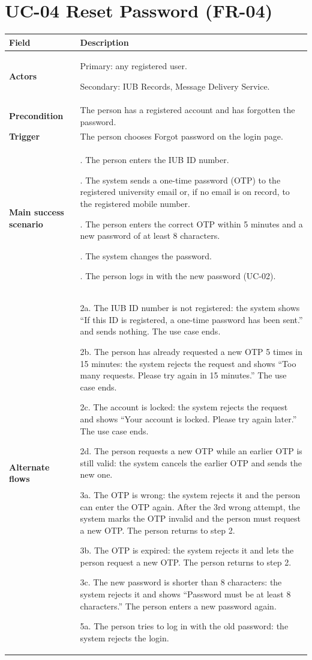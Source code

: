 \documentclass[11pt,a4paper]{report}
\begin{document}
\section{UC-04 Reset Password (FR-04)}
\begin{longtable}{|>{\raggedright\arraybackslash}p{3.0cm}|>{\raggedright\arraybackslash}p{12.4cm}|}
\hline \textbf{Field} & \textbf{Description} \\ \hline \endhead
\textbf{Actors} & Primary: any registered user.\par\smallskip Secondary: IUB Records, Message Delivery Service. \\ \hline
\textbf{Precondition} & The person has a registered account and has forgotten the password. \\ \hline
\textbf{Trigger} & The person chooses Forgot password on the login page. \\ \hline
\textbf{Main success scenario} & 1. The person enters the IUB ID number.\par\smallskip 2. The system sends a one-time password (OTP) to the registered university email or, if no email is on record, to the registered mobile number.\par\smallskip 3. The person enters the correct OTP within 5 minutes and a new password of at least 8 characters.\par\smallskip 4. The system changes the password.\par\smallskip 5. The person logs in with the new password (UC-02). \\ \hline
\textbf{Alternate flows} & 2a. The IUB ID number is not registered: the system shows ``If this ID is registered, a one-time password has been sent.'' and sends nothing. The use case ends.\par\smallskip 2b. The person has already requested a new OTP 5 times in 15 minutes: the system rejects the request and shows ``Too many requests. Please try again in 15 minutes.'' The use case ends.\par\smallskip 2c. The account is locked: the system rejects the request and shows ``Your account is locked. Please try again later.'' The use case ends.\par\smallskip 2d. The person requests a new OTP while an earlier OTP is still valid: the system cancels the earlier OTP and sends the new one.\par\smallskip 3a. The OTP is wrong: the system rejects it and the person can enter the OTP again. After the 3rd wrong attempt, the system marks the OTP invalid and the person must request a new OTP. The person returns to step 2.\par\smallskip 3b. The OTP is expired: the system rejects it and lets the person request a new OTP. The person returns to step 2.\par\smallskip 3c. The new password is shorter than 8 characters: the system rejects it and shows ``Password must be at least 8 characters.'' The person enters a new password again.\par\smallskip 5a. The person tries to log in with the old password: the system rejects the login. \\ \hline

\end{longtable}
\end{document}
